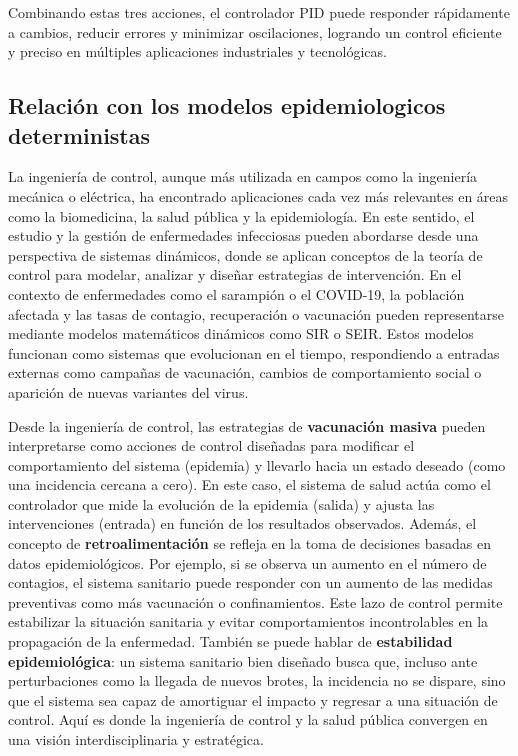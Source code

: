 \begin{enumerate}
Combinando estas tres acciones, el controlador PID puede responder rápidamente a cambios, reducir errores y minimizar oscilaciones, logrando un control eficiente y preciso en múltiples aplicaciones industriales y tecnológicas.


\subsection{Relación con los modelos epidemiologicos deterministas}
La ingeniería de control, aunque más utilizada en campos como la ingeniería mecánica o eléctrica, ha encontrado aplicaciones cada vez más relevantes en áreas como la biomedicina, la salud pública y la epidemiología. En este sentido, el estudio y la gestión de enfermedades infecciosas pueden abordarse desde una perspectiva de sistemas dinámicos, donde se aplican conceptos de la teoría de control para modelar, analizar y diseñar estrategias de intervención. En el contexto de enfermedades como el sarampión o el COVID-19, la población afectada y las tasas de contagio, recuperación o vacunación pueden representarse mediante modelos matemáticos dinámicos como SIR o SEIR. Estos modelos funcionan como sistemas que evolucionan en el tiempo, respondiendo a entradas externas como campañas de vacunación, cambios de comportamiento social o aparición de nuevas variantes del virus.

Desde la ingeniería de control, las estrategias de \textbf{vacunación masiva} pueden interpretarse como acciones de control diseñadas para modificar el comportamiento del sistema (epidemia) y llevarlo hacia un estado deseado (como una incidencia cercana a cero). En este caso, el sistema de salud actúa como el controlador que mide la evolución de la epidemia (salida) y ajusta las intervenciones (entrada) en función de los resultados observados.
Además, el concepto de \textbf{retroalimentación} se refleja en la toma de decisiones basadas en datos epidemiológicos. Por ejemplo, si se observa un aumento en el número de contagios, el sistema sanitario puede responder con un aumento de las medidas preventivas como más vacunación o confinamientos. Este lazo de control permite estabilizar la situación sanitaria y evitar comportamientos incontrolables en la propagación de la enfermedad.
También se puede hablar de \textbf{estabilidad epidemiológica}: un sistema sanitario bien diseñado busca que, incluso ante perturbaciones como la llegada de nuevos brotes, la incidencia no se dispare, sino que el sistema sea capaz de amortiguar el impacto y regresar a una situación de control. Aquí es donde la ingeniería de control y la salud pública convergen en una visión interdisciplinaria y estratégica.


\end{enumerate}
